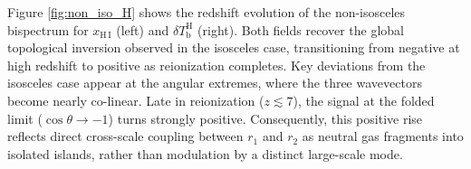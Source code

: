 \documentclass[apj,twocolumn, appendixfloats, twocolappendix, numberedappendix, tighten]{openjournal}
\begin{document}
Figure \ref{fig:non_iso_H} shows the redshift evolution of the non-isosceles bispectrum for $x_\mathrm{H\,I}$ (left) and $\delta T_\mathrm{b}^\mathrm{H}$ (right). Both fields recover the global topological inversion observed in the isosceles case, transitioning from negative at high redshift to positive as reionization completes. Key deviations from the isosceles case appear at the angular extremes, where the three wavevectors become nearly co-linear. Late in reionization ($z \lesssim 7$), the signal at the folded limit ($\cos\theta \to -1$) turns strongly positive. Consequently, this positive rise reflects direct cross-scale coupling between $r_1$ and $r_2$ as neutral gas fragments into isolated islands, rather than modulation by a distinct large-scale mode.




\end{document}
